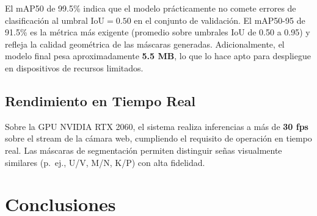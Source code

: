 \documentclass[12pt,letterpaper]{article}
\begin{document}
El mAP50 de 99.5\% indica que el modelo prácticamente no comete errores de clasificación al umbral $\text{IoU} = 0.50$ en el conjunto de validación. El mAP50-95 de 91.5\% es la métrica más exigente (promedio sobre umbrales IoU de 0.50 a 0.95) y refleja la calidad geométrica de las máscaras generadas. Adicionalmente, el modelo final pesa aproximadamente \textbf{5.5 MB}, lo que lo hace apto para despliegue en dispositivos de recursos limitados.

\subsection{Rendimiento en Tiempo Real}
Sobre la GPU NVIDIA RTX 2060, el sistema realiza inferencias a más de \textbf{30 fps} sobre el stream de la cámara web, cumpliendo el requisito de operación en tiempo real. Las máscaras de segmentación permiten distinguir señas visualmente similares (p.~ej., U/V, M/N, K/P) con alta fidelidad.

\section{Conclusiones}
\end{document}
